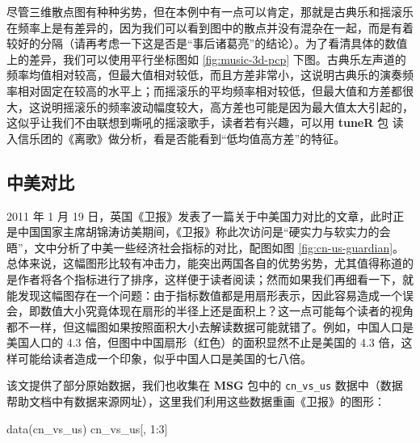 \documentclass[
  b5paper,
  UTF8,twoside]{book}
\newenvironment{Shaded}{\begin{snugshade}}{\end{snugshade}}
\newcommand{\DecValTok}[1]{\textcolor[rgb]{0.00,0.00,0.81}{#1}}
\newcommand{\FunctionTok}[1]{\textcolor[rgb]{0.00,0.00,0.00}{#1}}
\newcommand{\NormalTok}[1]{#1}
\newcommand{\SpecialCharTok}[1]{\textcolor[rgb]{0.00,0.00,0.00}{#1}}
\begin{document}
尽管三维散点图有种种劣势，但在本例中有一点可以肯定，那就是古典乐和摇滚乐在频率上是有差异的，因为我们可以看到图中的散点并没有混杂在一起，而是有着较好的分隔（请再考虑一下这是否是``事后诸葛亮''的结论）。为了看清具体的数值上的差异，我们可以使用平行坐标图如 \ref{fig:music-3d-pcp} 下图。古典乐左声道的频率均值相对较高，但最大值相对较低，而且方差非常小，这说明古典乐的演奏频率相对固定在较高的水平上；而摇滚乐的平均频率相对较低，但最大值和方差都很大，这说明摇滚乐的频率波动幅度较大，高方差也可能是因为最大值太大引起的，这似乎让我们不由联想到嘶吼的摇滚歌手，读者若有兴趣，可以用 \textbf{tuneR} 包 \citep{tuneR} 读入信乐团的《离歌》做分析，看是否能看到``低均值高方差''的特征。

\hypertarget{subsec:china-vs-us}{%
\subsection{中美对比}\label{subsec:china-vs-us}}

2011 年 1 月 19 日，英国《卫报》发表了一篇关于中美国力对比的文章，此时正是中国国家主席胡锦涛访美期间，《卫报》称此次访问是``硬实力与软实力的会晤''，文中分析了中美一些经济社会指标的对比，配图如图 \ref{fig:cn-us-guardian}。总体来说，这幅图形比较有冲击力，能突出两国各自的优势劣势，尤其值得称道的是作者将各个指标进行了排序，这样便于读者阅读；然而如果我们再细看一下，就能发现这幅图存在一个问题：由于指标数值都是用扇形表示，因此容易造成一个误会，即数值大小究竟体现在扇形的半径上还是面积上？这一点可能每个读者的视角都不一样，但这幅图如果按照面积大小去解读数据可能就错了。例如，中国人口是美国人口的 4.3 倍，但图中中国扇形（红色）的面积显然不止是美国的 4.3 倍，这样可能给读者造成一个印象，似乎中国人口是美国的七八倍。

该文提供了部分原始数据，我们也收集在 \textbf{MSG} 包中的 \texttt{cn\_vs\_us} 数据中（数据帮助文档中有数据来源网址），这里我们利用这些数据重画《卫报》的图形：

\begin{Shaded}
\begin{Highlighting}[]
\FunctionTok{data}\NormalTok{(cn\_vs\_us)}
\NormalTok{cn\_vs\_us[, }\DecValTok{1}\SpecialCharTok{:}\DecValTok{3}\NormalTok{]}
\end{Highlighting}
\end{Shaded}
\end{document}
